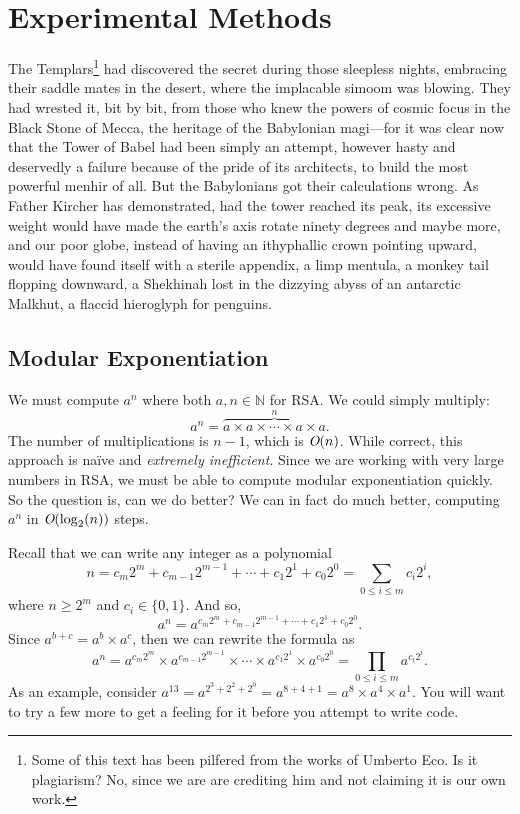 \documentclass[11pt]{article}
\begin{document}
\section{Experimental Methods}\label{ss:method}
The Templars\footnote{Some of this text has been pilfered from the works of Umberto Eco. Is it plagiarism? No, since we are are crediting him and not claiming it is our own work.}
had discovered the secret during those sleepless nights,
embracing their saddle mates in the desert, where the implacable
simoom was blowing. They had wrested it, bit by bit, from those who
knew the powers of cosmic focus in the Black Stone of Mecca, the
heritage of the Babylonian magi---for it was clear now that the Tower
of Babel had been simply an attempt, however hasty and deservedly
a failure because of the pride of its architects, to build the most
powerful menhir of all. But the Babylonians got their calculations
wrong. As Father Kircher has demonstrated, had the tower reached
its peak, its excessive weight would have made the earth’s axis
rotate ninety degrees and maybe more, and our poor globe, instead
of having an ithyphallic crown pointing upward, would have found
itself with a sterile appendix, a limp mentula, a monkey tail
flopping downward, a Shekhinah lost in the dizzying abyss of an
antarctic Malkhut, a flaccid hieroglyph for penguins.

\subsection{Modular Exponentiation}

We must compute $a^n$ where both $a, n \in \mathbb{N}$
for RSA. We could simply multiply:
\[
  a^n = \overbrace{a \times a \times \cdots \times a \times a}^n .
\]
The number of multiplications is $n-1$,
which is $\emph{O}(n)$. While correct, this approach is na{\"{i}}ve and
\emph{extremely inefficient}. Since we are working with very large
numbers in RSA, we must be able to compute modular exponentiation
quickly. So the question is, can we do better? We can in fact do much
better, computing $a^n$ in $\emph{O}(\log_2(n))$ steps.

Recall that we can write any integer as a polynomial
\[
  n = c_m 2^m + c_{m-1} 2^{m-1} + \cdots + c_1 2^1 + c_0 2^0 =
  \sum_{0\le i \le m} c_i 2^i ,
\]
where $n \ge 2^m$ and $c_i \in \{0, 1\}$. And so,
\[
  a^n = a^{c_m 2^m + c_{m-1} 2^{m-1} + \cdots + c_1 2^1 + c_0 2^0} .
\]
Since $a^{b+c} = a^b \times a^c$, then we can rewrite the formula as
\[
  a^n = a^{c_m 2^m} \times a^{c_{m-1} 2^{m-1}} \times \cdots \times
  a^{c_1 2^1} \times a^{c_0 2^0} = \prod_{0\le i \le m} a^{c_i 2^i} .
\]
As an example, consider $a^{13} = a^{2^3 + 2^2 + 2^0} = a^{8 + 4 + 1} =
a^8 \times a^4 \times a^1$. You will want to try a few more to get a
feeling for it before you attempt to write code.
\end{document}
